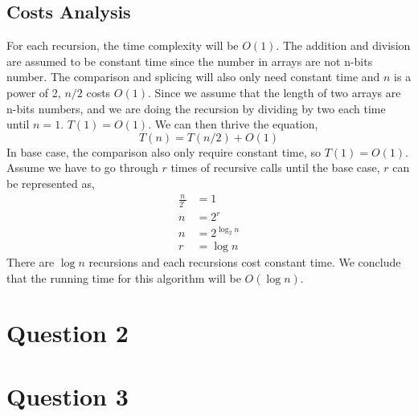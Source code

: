 \documentclass{article}
\begin{document}
    \subsection*{Costs Analysis}
    For each recursion, the time complexity will be $O(1)$. The addition and division are assumed to be constant time since the number in arrays are not n-bits number. The comparison and splicing
    will also only need constant time and $n$ is a power of 2, $n/2$ costs $O(1)$. Since we assume that the length of two arrays are n-bits numbers, and we are doing the recursion by dividing by two each time until $n=1$.
    $T(1) = O(1)$. We can then thrive the equation,
    $$T(n) = T(n/2) + O(1)$$
    In base case, the comparison also only require constant time, so $T(1) = O(1)$. Assume we have to go through $r$ times of recursive calls until the base case, $r$ can 
    be represented as,
    \begin{align}
        \frac{n}{2^r} &= 1 \nonumber \\
        n &= 2^r  \nonumber \\
        n &= 2^{\log_2 n} \nonumber \\
        r &= \log n \nonumber
    \end{align}
    There are $\log n$ recursions and each recursions cost constant time. We conclude that the running time for this algorithm will be $O(\log n)$.



    

\section*{Question 2}





\section*{Question 3}
\end{document}

